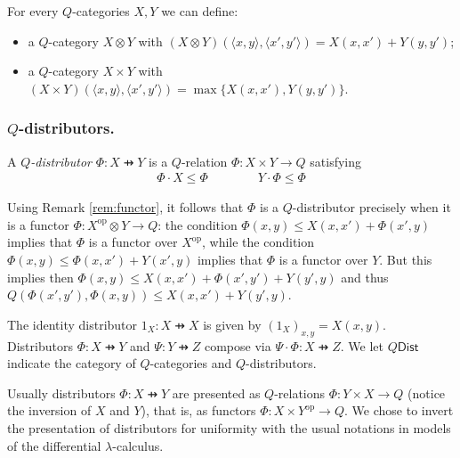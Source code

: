 \begin{example}
For every $Q$-categories $X,Y$ we can define:
\begin{itemize}
\item a $Q$-category $X\otimes Y$ with 
$(X\otimes Y)(\langle x,y\rangle, \langle x',y'\rangle)=X(x,x')+Y(y,y')$;
\item a $Q$-category $X\times Y$ with 
$(X\times Y)(\langle x,y\rangle, \langle x',y'\rangle)=\max\{X(x,x'),Y(y,y')\}$. 
\end{itemize}
\end{example}

\subsubsection{$Q$-distributors.}


A \emph{$Q$-distributor} $\Phi: X\pfun Y$ is a $Q$-relation $\Phi: X\times Y\to Q$ satisfying
\begin{align*}
\Phi\cdot X   \leq\Phi \qquad \qquad
Y \cdot \Phi  \leq \Phi
\end{align*}

\begin{remark}
Using Remark \ref{rem:functor}, it follows that $\Phi$ is a $Q$-distributor precisely when it is a functor $\Phi: X^{\mathrm{op}}\otimes Y \to Q$:
the condition $\Phi(x,y) \leq X(x,x')+\Phi(x',y)$ implies that $\Phi$ is a functor over $X^{\mathrm{op}}$, while
the condition $\Phi(x,y) \leq \Phi(x,x')+Y(x',y)$ implies that $\Phi$ is a functor over $Y$.
But this implies then 
$\Phi(x,y) \leq X(x,x') +\Phi(x',y')+Y(y',y)$ and thus $Q(\Phi(x',y'),\Phi(x,y))\leq X(x,x')+Y(y',y)$.
\end{remark}



The identity distributor $1_{X}:X\pfun X$ is given by $(1_{X})_{x,y}=X(x,y)$. 
Distributors $\Phi:X\pfun Y$ and $\Psi:Y\pfun Z$ compose via $\Psi\cdot \Phi:X\pfun Z$. 
We let $Q\mathsf{Dist}$ indicate the category of $Q$-categories and $Q$-distributors. 

\begin{remark}
Usually distributors $\Phi: X\pfun Y$ are presented as $Q$-relations $\Phi:Y\times X\to Q$ (notice the inversion of $X$ and $Y$), that is, as functors $\Phi: X\times Y^{\mathrm{op}}\to Q$. We chose to invert the presentation of distributors for uniformity with the usual notations in models of the differential $\lambda$-calculus. 
\end{remark}

